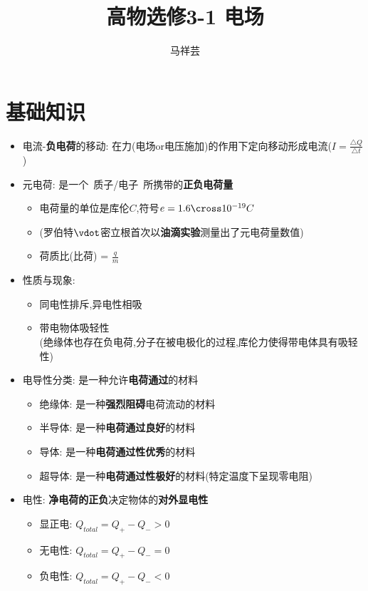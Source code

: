 \documentclass{article}
\title{高物选修3-1 \quad 电场}
\author{马祥芸}
\begin{document}
    \maketitle
    \tableofcontents
    \newpage

    \section{基础知识}  
    \begin{itemize}
        \item 电流-\textbf{负电荷}的移动: 在力(电场or电压施加)的作用下定向移动形成电流($I = \frac{\triangle Q}{\triangle t}$)
        \item 元电荷: 是一个\, 质子/电子\, 所携带的\textbf{正负电荷量}
            \begin{itemize}[label={}]
                \item 电荷量的单位是库伦$C$,符号$e = 1.6 \cross 10^{-19} C$ 
                \item (罗伯特$\vdot$密立根首次以\textbf{油滴实验}测量出了元电荷量数值)
                \item 荷质比(比荷) = $\frac{q}{m}$
            \end{itemize}
        
        \item 性质与现象:
        \begin{itemize}
            \item 同电性排斥,异电性相吸
            \item 带电物体吸轻性    \\
            (绝缘体也存在负电荷,分子在被电极化的过程,库伦力使得带电体具有吸轻性)
            
        \end{itemize}
        \item 电导性分类: 是一种允许\textbf{电荷通过}的材料
        
        \begin{itemize}
            \item 绝缘体: 是一种\textbf{强烈阻碍}电荷流动的材料
            \item 半导体: 是一种\textbf{电荷通过良好}的材料
            \item 导体: 是一种\textbf{电荷通过性优秀}的材料
            \item 超导体: 是一种\textbf{电荷通过性极好}的材料(特定温度下呈现零电阻)
        \end{itemize} 
        
        \item 电性: \textbf{净电荷的正负}决定物体的\textbf{对外显电性}
        
        \begin{itemize}
            \item 显正电: \quad $Q_{total} = Q_{+} - Q_{-} > 0 $
            \item 无电性: \quad $Q_{total} = Q_{+} - Q_{-} = 0 $
            \item 负电性: \quad $Q_{total} = Q_{+} - Q_{-} < 0 $
        \end{itemize}

    \end{itemize}
\end{document}
